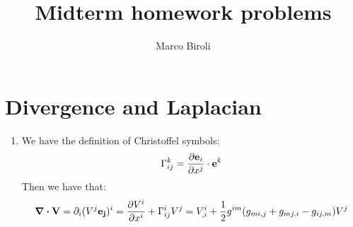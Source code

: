 \documentclass[10pt,a4paper]{article}
\author{Marco Biroli}
\title{Midterm homework problems}
\begin{document}
\maketitle

\section{Divergence and Laplacian}

\begin{enumerate}

\item We have the definition of Christoffel symbols:
\[
\Gamma_{ij}^k = \pdv{\vb{e}_i}{x^j} \cdot \vb{e}^k
\]
Then we have that:
\[
\div \vb{V} = \partial_i ( V^j \vb{e_j})^i = \pdv{V^i}{x^i} + \Gamma^i_{i j} V^j = V^i_{, i} + \frac{1}{2} g^{im} ( g_{mi, j} + g_{mj, i} - g_{i j, m} ) V^j
\]

\end{enumerate}
\end{document}
